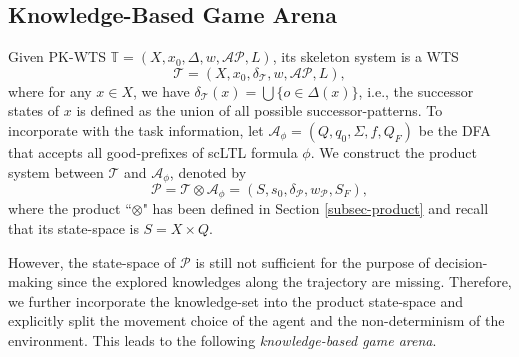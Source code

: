 \documentclass{ifacconf}
\def \AP{\mathcal{AP}}
\def \A{\mathcal{A}}
\def \P{\mathcal{P}}
\def \T{\mathbb{T}}
\begin{document}
\subsection{Knowledge-Based Game Arena}
Given  PK-WTS  $\T=(X,x_0,\Delta,w,\AP,L)$,  its skeleton system is a WTS 
\[
\mathcal{T}=(X,x_0,\delta_{\mathcal{T}},w,\AP,L),
\]
where  for any $x\in X$, we have 
$\delta_{\mathcal{T}}(x)=\bigcup\{ o\in \Delta(x)\}$, i.e., the successor states of $x$ is defined as the union of all possible successor-patterns. 
To incorporate with the task information,  let $\A_\phi\!=\!(Q,q_0,\Sigma,f,Q_F)$ be the DFA that accepts all good-prefixes of scLTL formula $\phi$. We construct the product system between  $\mathcal{T}$ and $\A_\phi$, denoted by 
\[
\P=\mathcal{T}\otimes \A_\phi=(S,s_0,\delta_\P,w_\P,S_F), 
\]
where the product ``$\otimes$" has been defined in Section \ref{subsec-product} and recall that its state-space is $S=X\times Q$.
 
However, the state-space of $\P$ is still not sufficient for the purpose of decision-making since the explored knowledges along the trajectory are missing. Therefore, we further incorporate the knowledge-set into the product state-space and explicitly split the movement  choice of the agent and the non-determinism of the environment. This leads to the following \emph{knowledge-based game arena}.  
\end{document}
